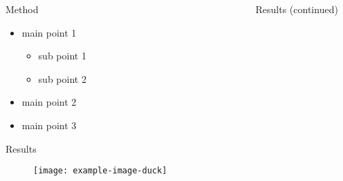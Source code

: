 \documentclass{beamer}
\newlength{\sepwidth}
\newlength{\colwidth}
\newcommand{\separatorcolumn}{\begin{column}{\sepwidth}\end{column}}
\begin{document}
\begin{frame}[t]
\begin{columns}[t]
\begin{column}{\colwidth}
\begin{block}{Method}
    \lipsum[1][1]
    \begin{itemize}
        \item main point 1
        \begin{itemize}
            \item sub point 1
            \item sub point 2
        \end{itemize}
        \item main point 2
        \item main point 3
    \end{itemize}
     \lipsum[1][1-5]
    \end{block}
    \begin{block}{Results}
    \begin{figure}
        \begin{minipage}[c]{0.83\textwidth}
        \texttt{[image: example-image-duck]}
        \end{minipage}\hfill
        \begin{minipage}[c]{0.17\textwidth}
        \caption{
       \lipsum[1][1-3] }
       \label{fig:03-03}
        \end{minipage}
    \end{figure}
    \lipsum[1][1-4]



    \end{block}


\end{column}

\separatorcolumn

\begin{column}{\colwidth}

  \begin{block}{Results (continued)}
     
    
        

\end{block}
\end{column}
\end{columns}
\end{frame}
\end{document}

